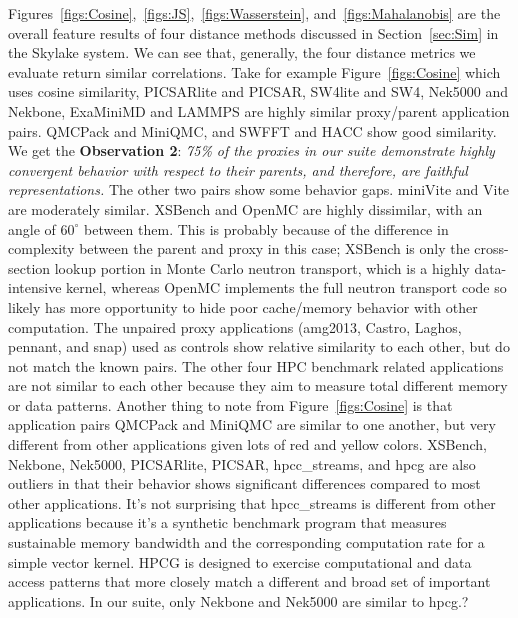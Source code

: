Figures~\ref{figs:Cosine},~\ref{figs:JS},~\ref{figs:Wasserstein}, and~\ref{figs:Mahalanobis} are the overall feature results of four distance methods discussed in Section~\ref{sec:Sim} in the Skylake system. We can see that, generally, the four distance metrics we evaluate return similar correlations. Take for example Figure~\ref{figs:Cosine} which uses cosine similarity, PICSARlite and PICSAR, SW4lite and SW4, Nek5000 and Nekbone, ExaMiniMD and LAMMPS are highly similar proxy/parent application pairs. QMCPack and MiniQMC, and SWFFT and HACC show good similarity.  We get the \textbf{Observation 2}: \textit{75\% of the proxies in our suite demonstrate highly convergent behavior with respect to their parents, and therefore, are faithful representations.} The other two pairs show some behavior gaps. miniVite and Vite are moderately similar. XSBench and OpenMC are highly dissimilar, with an angle of $60^\circ$ between them. This is probably because of the difference in complexity between the parent and proxy in this case; XSBench is only the cross-section lookup portion in Monte Carlo neutron transport, which is a highly data-intensive kernel, whereas OpenMC implements the full neutron transport code so likely has more opportunity to hide poor cache/memory behavior with other computation. The unpaired proxy applications (amg2013, Castro, Laghos, pennant, and snap) used as controls show relative similarity to each other, but do not match the known pairs. The other four HPC benchmark related applications are not similar to each other because they aim to measure total different memory or data patterns. Another thing to note from Figure~\ref{figs:Cosine} is that application pairs QMCPack and MiniQMC are similar to one another, but very different from other applications given lots of red and yellow colors. XSBench, Nekbone, Nek5000, PICSARlite, PICSAR, hpcc\_streams, and hpcg are also outliers in that their behavior shows significant differences compared to most other applications.  It's not surprising that hpcc\_streams is different from other applications because it's a synthetic benchmark program that measures sustainable memory bandwidth and the corresponding computation rate for a simple vector kernel. HPCG is designed to exercise computational and data access patterns that more closely match a different and broad set of important applications. In our suite, only Nekbone and Nek5000 are similar to hpcg.\si{?}

